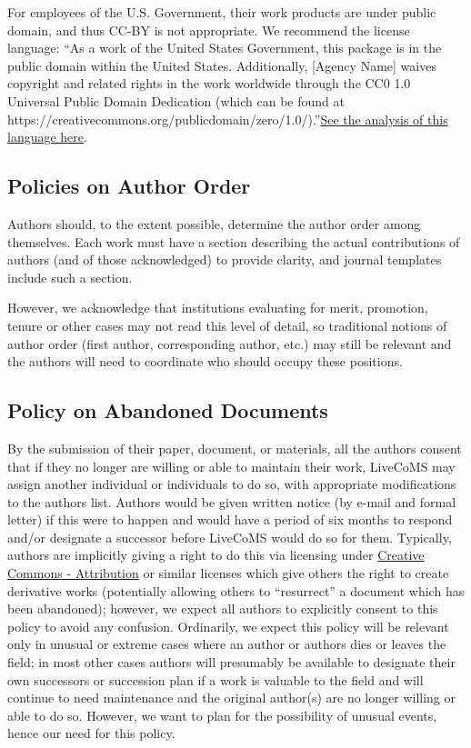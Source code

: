 \documentclass{article}
\begin{document}
For employees of the U.S. Government, their work products are under
public domain, and thus CC-BY is not appropriate. We recommend the
license language: ``As a work of the United States Government, this
package is in the public domain within the United
States. Additionally, [Agency Name] waives copyright and related
rights in the work worldwide through the CC0 1.0 Universal Public
Domain Dedication (which can be found at
https://creativecommons.org/publicdomain/zero/1.0/).''\href{https://theunitedstates.io/licensing/}{See the analysis of this language here}.

\subsection{Policies on Author Order}
Authors should, to the extent possible, determine the author order
among themselves.  Each work must have a section describing the actual
contributions of authors (and of those acknowledged) to provide
clarity, and journal templates include such a section.  

However, we acknowledge that institutions evaluating for merit, promotion, tenure
or other cases may not read this level of detail, so traditional
notions of author order (first author, corresponding author, etc.) may
still be relevant and the authors will need to coordinate who should
occupy these positions.


\subsection{Policy on Abandoned Documents}

By the submission of their paper, document, or materials, all the
authors consent that if they no longer are willing or able to maintain
their work, LiveCoMS may assign another individual or individuals to
do so, with appropriate modifications to the authors list. Authors
would be given written notice (by e-mail and formal letter) if this
were to happen and would have a period of six months to respond and/or
designate a successor before LiveCoMS would do so for them. Typically,
authors are implicitly giving a right to do this via licensing under
\href{https://creativecommons.org/licenses/by/4.0/}{Creative Commons -
  Attribution} or
similar licenses which give others the right to create derivative
works (potentially allowing others to ``resurrect'' a document which
has been abandoned); however, we expect all authors to explicitly
consent to this policy to avoid any confusion. Ordinarily, we expect
this policy will be relevant only in unusual or extreme cases where an
author or authors dies or leaves the field; in most other cases
authors will presumably be available to designate their own successors
or succession plan if a work is valuable to the field and will
continue to need maintenance and the original author(s) are no longer
willing or able to do so. However, we want to plan for the possibility
of unusual events, hence our need for this policy.
\end{document}

